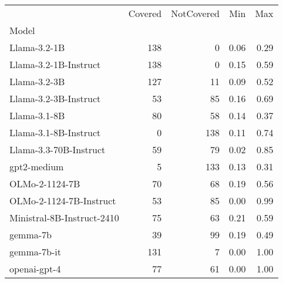\begin{tabular}{lrrrr}
\toprule
 & Covered & NotCovered & Min & Max \\
Model &  &  &  &  \\
\midrule
Llama-3.2-1B & 138 & 0 & 0.06 & 0.29 \\
Llama-3.2-1B-Instruct & 138 & 0 & 0.15 & 0.59 \\
Llama-3.2-3B & 127 & 11 & 0.09 & 0.52 \\
Llama-3.2-3B-Instruct & 53 & 85 & 0.16 & 0.69 \\
Llama-3.1-8B & 80 & 58 & 0.14 & 0.37 \\
Llama-3.1-8B-Instruct & 0 & 138 & 0.11 & 0.74 \\
Llama-3.3-70B-Instruct & 59 & 79 & 0.02 & 0.85 \\
gpt2-medium & 5 & 133 & 0.13 & 0.31 \\
OLMo-2-1124-7B & 70 & 68 & 0.19 & 0.56 \\
OLMo-2-1124-7B-Instruct & 53 & 85 & 0.00 & 0.99 \\
Ministral-8B-Instruct-2410 & 75 & 63 & 0.21 & 0.59 \\
gemma-7b & 39 & 99 & 0.19 & 0.49 \\
gemma-7b-it & 131 & 7 & 0.00 & 1.00 \\
openai-gpt-4 & 77 & 61 & 0.00 & 1.00 \\
\bottomrule
\end{tabular}

